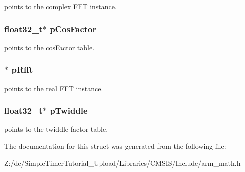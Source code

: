 points to the complex F\-F\-T instance. \hypertarget{structarm__dct4__instance__f32_abd73b9d7fb4951ba086e4820c2a48eb0}{
\subsubsection[{p\-Cos\-Factor}]{\setlength{\rightskip}{0pt plus 5cm}float32\-\_\-t$\ast$ p\-Cos\-Factor}}\label{structarm__dct4__instance__f32_abd73b9d7fb4951ba086e4820c2a48eb0}
points to the cos\-Factor table. \hypertarget{structarm__dct4__instance__f32_ad4cd7c85eea3f7c5fff4630bbd979e6a}{
\subsubsection[{p\-Rfft}]{$\ast$ p\-Rfft}}\label{structarm__dct4__instance__f32_ad4cd7c85eea3f7c5fff4630bbd979e6a}
points to the real F\-F\-T instance. \hypertarget{structarm__dct4__instance__f32_aca581481fccdff0f557f54a3ef20d967}{
\subsubsection[{p\-Twiddle}]{\setlength{\rightskip}{0pt plus 5cm}float32\-\_\-t$\ast$ p\-Twiddle}}\label{structarm__dct4__instance__f32_aca581481fccdff0f557f54a3ef20d967}
points to the twiddle factor table. 

The documentation for this struct was generated from the following file\-:\begin{DoxyCompactItemize}
\item 
Z\-:/dc/\-Simple\-Timer\-Tutorial\-\_\-\-Upload/\-Libraries/\-C\-M\-S\-I\-S/\-Include/arm\-\_\-math.\-h\end{DoxyCompactItemize}
